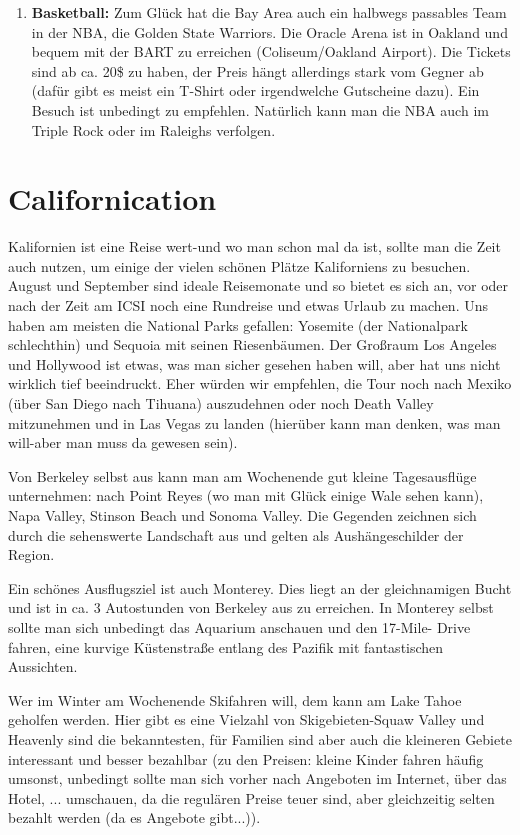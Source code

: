 \documentclass[a4paper]{scrreprt}
\begin{document}
\begin{enumerate}
	\item \textbf{Basketball:} Zum Glück hat die Bay Area auch ein halbwegs passables Team in der NBA, die Golden State Warriors. Die Oracle Arena ist in Oakland und bequem mit der BART zu erreichen (Coliseum/Oakland Airport). Die Tickets sind ab ca. 20\$ zu haben, der Preis hängt allerdings stark vom Gegner ab (dafür gibt es meist ein T-Shirt oder irgendwelche Gutscheine dazu). Ein Besuch ist unbedingt zu empfehlen. Natürlich kann man die NBA auch im Triple Rock oder im Raleighs verfolgen.

\end{enumerate}

\section{Californication}

Kalifornien ist eine Reise wert-und wo man schon mal da ist, sollte man die Zeit auch nutzen, um einige der vielen schönen Plätze Kaliforniens zu besuchen. August und September sind ideale Reisemonate und so bietet es sich an, vor oder nach der Zeit am ICSI noch eine Rundreise und etwas Urlaub zu machen. Uns haben am meisten die National Parks gefallen: Yosemite (der Nationalpark schlechthin) und Sequoia mit seinen Riesenbäumen. Der Großraum Los Angeles und Hollywood ist etwas, was man sicher gesehen haben will, aber hat uns nicht wirklich tief beeindruckt. Eher würden wir empfehlen, die Tour noch nach Mexiko (über San Diego nach Tihuana) auszudehnen oder noch Death Valley mitzunehmen und in Las Vegas zu landen (hierüber kann man denken, was man will-aber man muss da gewesen sein).

Von Berkeley selbst aus kann man am Wochenende gut kleine Tagesausflüge unternehmen: nach Point Reyes (wo man mit Glück einige Wale sehen kann), Napa Valley, Stinson Beach und Sonoma Valley. Die Gegenden zeichnen sich durch die sehenswerte Landschaft aus und gelten als Aushängeschilder der Region.

Ein schönes Ausflugsziel ist auch Monterey. Dies liegt an der gleichnamigen Bucht und ist in ca. 3 Autostunden von Berkeley aus zu erreichen. In Monterey selbst sollte man sich unbedingt das Aquarium anschauen und den 17-Mile- Drive fahren, eine kurvige Küstenstraße entlang des Pazifik mit fantastischen Aussichten.

Wer im Winter am Wochenende Skifahren will, dem kann am Lake Tahoe geholfen werden. Hier gibt es eine Vielzahl von Skigebieten-Squaw Valley und Heavenly sind die bekanntesten, für Familien sind aber auch die kleineren Gebiete interessant und besser bezahlbar (zu den Preisen: kleine Kinder fahren häufig umsonst, unbedingt sollte man sich vorher nach Angeboten im Internet, über das Hotel, ... umschauen, da die regulären Preise teuer sind, aber gleichzeitig selten bezahlt werden (da es Angebote gibt...)).
\end{document}
